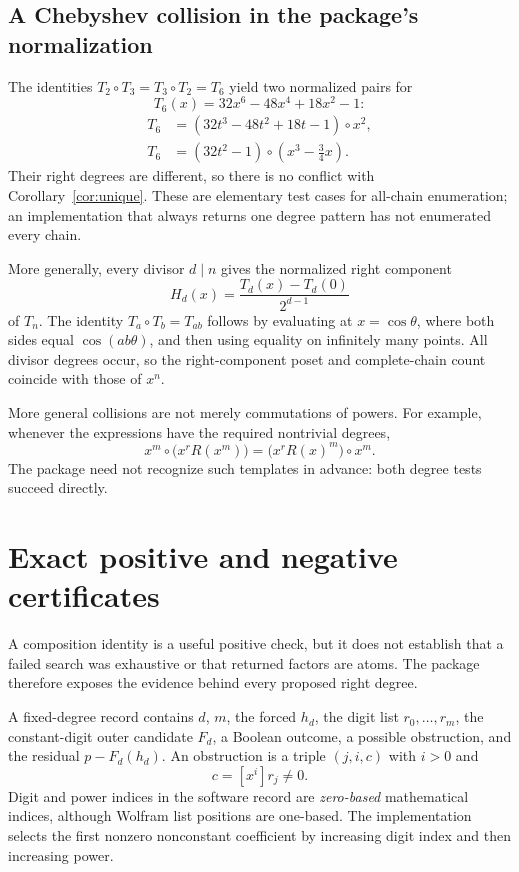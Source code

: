 \documentclass[11pt,a4paper]{article}
\numberwithin{equation}{section}
\theoremstyle{definition}
\theoremstyle{remark}
\begin{document}
\subsection{A Chebyshev collision in the package's normalization}
The identities $T_2\circ T_3=T_3\circ T_2=T_6$ yield two normalized pairs for
\[
 T_6(x)=32x^6-48x^4+18x^2-1:
\]
\begin{align*}
 T_6&=(32t^3-48t^2+18t-1)\circ x^2,\\
 T_6&=(32t^2-1)\circ\left(x^3-\frac34x\right).
\end{align*}
Their right degrees are different, so there is no conflict with
Corollary~\ref{cor:unique}. These are elementary test cases for all-chain
enumeration; an implementation that always returns one degree pattern has
not enumerated every chain.

More generally, every divisor \(d\mid n\) gives the normalized right component
\[
 H_d(x)=\frac{T_d(x)-T_d(0)}{2^{d-1}}
\]
of \(T_n\).  The identity \(T_a\circ T_b=T_{ab}\) follows by evaluating at
\(x=\cos\theta\), where both sides equal \(\cos(ab\theta)\), and then using
equality on infinitely many points.  All divisor degrees occur, so the
right-component poset and complete-chain count coincide with those of \(x^n\).

More general collisions are not merely commutations of powers. For example,
whenever the expressions have the required nontrivial degrees,
\[
 x^m\circ\bigl(x^rR(x^m)\bigr)
 =\bigl(x^rR(x)^m\bigr)\circ x^m.
\]
The package need not recognize such templates in advance: both degree tests
succeed directly.

\section{Exact positive and negative certificates}
\label{sec:certificates}
A composition identity is a useful positive check, but it does not establish
that a failed search was exhaustive or that returned factors are atoms. The
package therefore exposes the evidence behind every proposed right degree.

A fixed-degree record contains $d$, $m$, the forced $h_d$, the digit list
$r_0,\ldots,r_m$, the constant-digit outer candidate $F_d$, a Boolean outcome,
a possible obstruction, and the residual $p-F_d(h_d)$. An obstruction is a
triple $(j,i,c)$ with $i>0$ and
\[
 c=[x^i]r_j\ne0.
\]
Digit and power indices in the software record are \emph{zero-based}
mathematical indices, although Wolfram list positions are one-based. The
implementation selects the first nonzero nonconstant coefficient by increasing
digit index and then increasing power.
\end{document}
